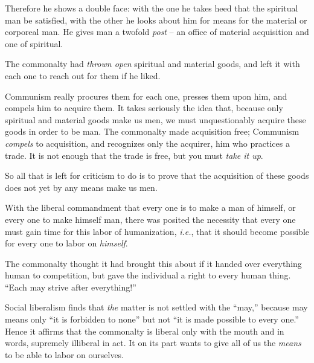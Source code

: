 Therefore he shows a double face: with the one he takes heed that the 
spiritual man be satisfied, with the other he looks about him for means for 
the material or corporeal man. He gives man a twofold \textit{post} -- an 
office of material acquisition and one of spiritual.

The commonalty had \textit{thrown open} spiritual and material goods, and left 
it with each one to reach out for them if he liked.

Communism really procures them for each one, presses them upon him, and 
compels him to acquire them. It takes seriously the idea that, because only 
spiritual and material goods make us men, we must unquestionably acquire these 
goods in order to be man. The commonalty made acquisition free; Communism 
\textit{compels} to acquisition, and recognizes only the acquirer, him who 
practices a trade. It is not enough that the trade is free, but you must 
\textit{take it up}.

So all that is left for criticism to do is to prove that the acquisition of 
these goods does not yet by any means make us men.

With the liberal commandment that every one is to make a man of himself, or 
every one to make himself man, there was posited the necessity that every one 
must gain time for this labor of humanization, \textit{i.e.}, that it should 
become possible for every one to labor on \textit{himself}.

The commonalty thought it had brought this about if it handed over everything 
human to competition, but gave the individual a right to every human thing. 
``Each may strive after everything!''

Social liberalism finds that \textit{the} matter is not settled with the 
``may,'' because may means only ``it is forbidden to none'' but not ``it 
is made possible to every one.'' Hence it affirms that the commonalty is 
liberal only with the mouth and in words, supremely illiberal in act. It on 
its part wants to give all of us the \textit{means} to be able to labor on 
ourselves.


